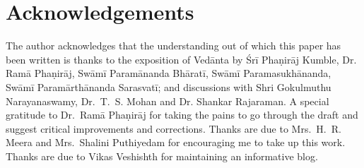 \newpage

\section*{Acknowledgements}

The author acknowledges that the understanding out of which this paper has been written is thanks to the exposition of Vedānta by Śrī Phaṇirāj Kumble, Dr. Ramā Phaṇirāj, Swāmī Paramānanda Bhāratī, Swāmī Paramasukhānanda, Swāmī Paramārthānanda Sarasvatī; and discussions with Shri Gokulmuthu Narayanaswamy, Dr.~T.~S. Mohan and Dr. Shankar Rajaraman. A special gratitude to Dr.~Ramā Phaṇirāj for taking the pains to go through the draft and suggest critical improvements and corrections. Thanks are due to Mrs.~H.~R. Meera and Mrs.~Shalini Puthiyedam for encouraging me to take up this work. Thanks are due to Vikas Veshishth for maintaining an informative blog.


